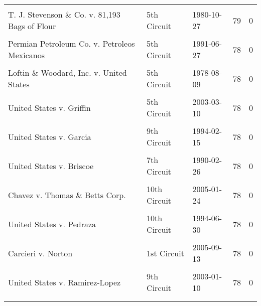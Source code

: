 \documentclass[10pt, letterpaper]{article}
\begin{document}
\begin{spacing}{1.0}
\begin{footnotesize}
\begin{longtable}[H]{p{3.5in}llrr}
& & & &\\[-6pt]
T. J. Stevenson \& Co. v. 81,193 Bags of Flour & 5th Circuit & 1980-10-27 & 79 & 0\\
& & & &\\[-6pt]
Permian Petroleum Co. v. Petroleos Mexicanos & 5th Circuit & 1991-06-27 & 78 & 0\\
& & & &\\[-6pt]
Loftin \& Woodard, Inc. v. United States & 5th Circuit & 1978-08-09 & 78 & 0\\
& & & &\\[-6pt]
United States v. Griffin & 5th Circuit & 2003-03-10 & 78 & 0\\
& & & &\\[-6pt]
United States v. Garcia & 9th Circuit & 1994-02-15 & 78 & 0\\
& & & &\\[-6pt]
United States v. Briscoe & 7th Circuit & 1990-02-26 & 78 & 0\\
& & & &\\[-6pt]
Chavez v. Thomas \& Betts Corp. & 10th Circuit & 2005-01-24 & 78 & 0\\
& & & &\\[-6pt]
United States v. Pedraza & 10th Circuit & 1994-06-30 & 78 & 0\\
& & & &\\[-6pt]
Carcieri v. Norton & 1st Circuit & 2005-09-13 & 78 & 0\\
& & & &\\[-6pt]
United States v. Ramirez-Lopez & 9th Circuit & 2003-01-10 & 78 & 0\\
    \hline\\[-6pt]
    \label{tab:topDiffLegalTopicsAssigned}
\end{longtable}
\end{footnotesize}

\end{spacing}
\end{document}
